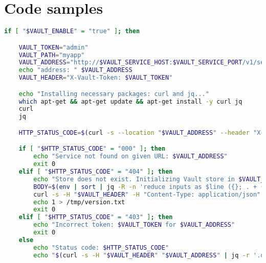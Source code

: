 \section{Code samples}



\begin{lstlisting}[language=bash, caption={liveness probe bash script}, label={lst:your_script}]
if [ "$VAULT_ENABLE" = "true" ]; then

    VAULT_TOKEN="admin"
    VAULT_PATH="myapp"
    VAULT_ADDRESS="http://$VAULT_SERVICE_HOST:$VAULT_SERVICE_PORT/v1/secret/data/$VAULT_PATH"
    echo "address: " $VAULT_ADDRESS
    VAULT_HEADER="X-Vault-Token: $VAULT_TOKEN"

    echo "Installing necessary packages: curl and jq..."
    which apt-get && apt-get update && apt-get install -y curl jq
    curl
    jq

    HTTP_STATUS_CODE=$(curl -s --location "$VAULT_ADDRESS" --header "X-Vault-Token: $VAULT_TOKEN" -o /dev/null -w "%{http_code}")

    if [ "$HTTP_STATUS_CODE" = "000" ]; then
        echo "Service not found on given URL: $VAULT_ADDRESS"
        exit 0
    elif [ "$HTTP_STATUS_CODE" = "404" ]; then
        echo "Store does not exist. Initializing Vault store in $VAULT_PATH for the first time..."
        BODY=$(env | sort | jq -R -n 'reduce inputs as $line ({}; . + ($line | split("=") | {(.[0]): .[1]})) | {"data": .}')
        curl -s -H "$VAULT_HEADER" -H "Content-Type: application/json" -X POST -d "$BODY" "$VAULT_ADDRESS" -o /dev/null
        echo 1 > /tmp/version.txt
        exit 0
    elif [ "$HTTP_STATUS_CODE" = "403" ]; then
        echo "Incorrect token: $VAULT_TOKEN for $VAULT_ADDRESS"
        exit 0
    else
        echo "Status code: $HTTP_STATUS_CODE"
        echo "$(curl -s -H "$VAULT_HEADER" "$VAULT_ADDRESS" | jq -r '.data.metadata.version')" > /tmp/liveness-version.txt


\end{lstlisting}
